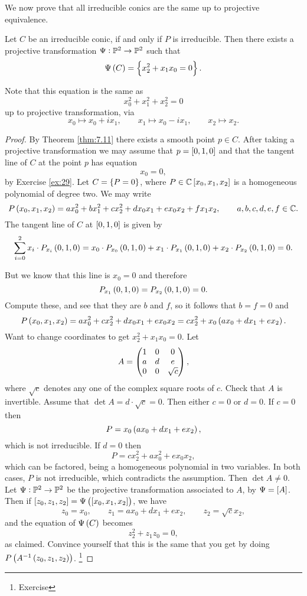 We now prove that all irreducible conics are the same up to projective equivalence.

\begin{theorem}
\label{thm:10.2}
Let $ C $ be an irreducible conic, if and only if $ P $ is irreducible. Then there exists a projective transformation $ \Psi : \mathbb{P}^2 \to \mathbb{P}^2 $ such that
$$ \Psi\br{C} = \cbr{x_2^2 + x_1x_0 = 0}. $$
\end{theorem}

\begin{remark}
Note that this equation is the same as
$$ x_0^2 + x_1^2 + x_2^2 = 0 $$
up to projective transformation, via
$$ x_0 \mapsto x_0 + ix_1, \qquad x_1 \mapsto x_0 - ix_1, \qquad x_2 \mapsto x_2. $$
\end{remark}

\begin{proof}
By Theorem \ref{thm:7.11} there exists a smooth point $ p \in C $. After taking a projective transformation we may assume that $ p = \sbr{0, 1, 0} $ and that the tangent line of $ C $ at the point $ p $ has equation
$$ x_0 = 0, $$
by Exercise \ref{ex:29}. Let $ C = \cbr{P = 0} $, where $ P \in \CC\sbr{x_0, x_1, x_2} $ is a homogeneous polynomial of degree two. We may write
$$ P\br{x_0, x_1, x_2} = ax_0^2 + bx_1^2 + cx_2^2 + dx_0x_1 + ex_0x_2 + fx_1x_2, \qquad a, b, c, d, e, f \in \CC. $$
The tangent line of $ C $ at $ \sbr{0, 1, 0} $ is given by
$$ \sum_{i = 0}^2 x_i \cdot P_{x_i}\br{0, 1, 0} = x_0 \cdot P_{x_0}\br{0, 1, 0} + x_1 \cdot P_{x_1}\br{0, 1, 0} + x_2 \cdot P_{x_2}\br{0, 1, 0} = 0. $$

\pagebreak

But we know that this line is $ x_0 = 0 $ and therefore
$$ P_{x_1}\br{0, 1, 0} = P_{x_2}\br{0, 1, 0} = 0. $$
Compute these, and see that they are $ b $ and $ f $, so it follows that $ b = f = 0 $ and
$$ P\br{x_0, x_1, x_2} = ax_0^2 + cx_2^2 + dx_0x_1 + ex_0x_2 = cx_2^2 + x_0\br{ax_0 + dx_1 + ex_2}. $$
Want to change coordinates to get $ x_2^2 + x_1x_0 = 0 $. Let
$$ A = \begin{pmatrix} 1 & 0 & 0 \\ a & d & e \\ 0 & 0 & \sqrt{c} \end{pmatrix}, $$
where $ \sqrt{c} $ denotes any one of the complex square roots of $ c $. Check that $ A $ is invertible. Assume that $ \det A = d \cdot \sqrt{c} = 0 $. Then either $ c = 0 $ or $ d = 0 $. If $ c = 0 $ then
$$ P = x_0\br{ax_0 + dx_1 + ex_2}, $$
which is not irreducible. If $ d = 0 $ then
$$ P = cx_2^2 + ax_0^2 + ex_0x_2, $$
which can be factored, being a homogeneous polynomial in two variables. In both cases, $ P $ is not irreducible, which contradicts the assumption. Then $ \det A \ne 0 $. Let $ \Psi : \mathbb{P}^2 \to \mathbb{P}^2 $ be the projective transformation associated to $ A $, by $ \Psi = \sbr{A} $. Then if $ \sbr{z_0, z_1, z_2} = \Psi\br{\sbr{x_0, x_1, x_2}} $, we have
$$ z_0 = x_0, \qquad z_1 = ax_0 + dx_1 + ex_2, \qquad z_2 = \sqrt{c}x_2, $$
and the equation of $ \Psi\br{C} $ becomes
$$ z_2^2 + z_1z_0 = 0, $$
as claimed. Convince yourself that this is the same that you get by doing $ P\br{A^{-1}\br{z_0, z_1, z_2}} $. \footnote{Exercise}
\end{proof}

